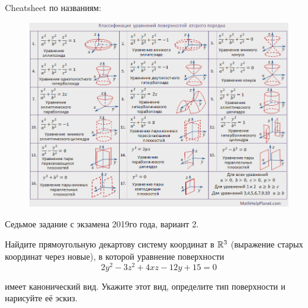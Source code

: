 \documentclass[a4paper]{article}
\begin{document}
    Cheatsheet по названиям:
    \begin{figure}[h]
        \centering
        \includegraphics[width=\textwidth]{img/lines.png}
    \end{figure}

    Седьмое задание с экзамена 2019го года, вариант 2. 
    
    Найдите прямоугольную декартову систему координат в $\mathbb{R}^3$ (выражение старых координат через новые), в которой уравнение поверхности
    \begin{equation*}
        2y^2 - 3z^2 + 4xz - 12y + 15 = 0
    \end{equation*}

    имеет канонический вид. Укажите этот вид, определите тип поверхности и нарисуйте её эскиз.
\end{document}
